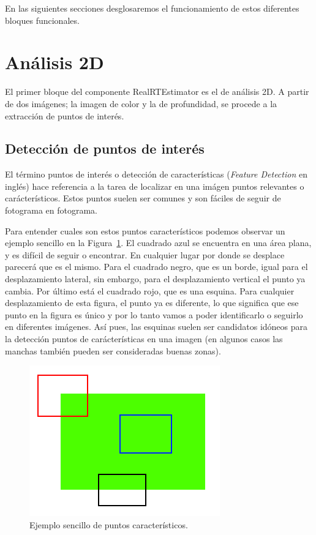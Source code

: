 En las siguientes secciones desglosaremos el funcionamiento de estos diferentes bloques funcionales.

\section{Análisis 2D}

El primer bloque del componente RealRTEstimator es el de análisis 2D. A partir de dos imágenes; la imagen de color y la de profundidad, se procede a la extracción de puntos de interés.

\subsection{Detección de puntos de interés}

El término puntos de interés o detección de características (\textit{Feature Detection} en inglés) hace referencia a la tarea de localizar en una imágen puntos relevantes o carácterísticos. Estos puntos suelen ser comunes y son fáciles de seguir de fotograma en fotograma.

Para entender cuales son estos puntos característicos podemos observar un ejemplo sencillo en la Figura~\ref{fig:feature_simple}. El cuadrado azul se encuentra en una área plana, y es difícil de seguir o encontrar. En cualquier lugar por donde se desplace parecerá que es el mismo. Para el cuadrado negro, que es un borde, igual para el desplazamiento lateral, sin embargo, para el desplazamiento vertical el punto ya cambia. Por último está el cuadrado rojo, que es una esquina. Para cualquier desplazamiento de esta figura, el punto ya es diferente, lo que significa que ese punto en la figura es único y por lo tanto vamos a poder identificarlo o seguirlo en diferentes imágenes. Así pues, las esquinas suelen ser candidatos idóneos para la detección puntos de carácterísticas en una imagen (en algunos casos las manchas también pueden ser consideradas buenas zonas).

\begin{figure}[!ht]
\centering
\includegraphics[scale=0.7]{Figures/feature_simple.png}
\decoRule
\caption[Ejemplo de puntos de interés]{Ejemplo sencillo de puntos característicos.}
\label{fig:feature_simple}
\end{figure}

